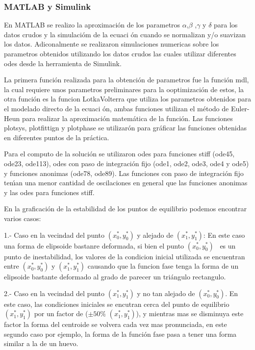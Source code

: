 \documentclass[letterpaper,11pt]{article}
\begin{document}
\bigskip

\subsubsection{MATLAB y Simulink}

En MATLAB se realizo la aproximaci\'{o}n de los parametros $\alpha $,$\beta $%
,$\gamma $ y $\delta $ para los datos crudos y la simulaci\'{o}m de la ecuaci%
\'{o}n cuando se normalizan y/o suavizan los datos. Adiconalmente se
realizaron simulaciones numericas sobre los parametros obtenidos utilizando
los datos crudos las cuales utilizar diferentes odes desde la herramienta de
Simulink.

La primera funci\'{o}n realizada para la obtenci\'{o}n de parametros fue la
funci\'{o}n mdl, la cual requiere unos parametros preliminares para la
ooptimizaci\'{o}n de estos, la otra funci\'{o}n es la funcion LotkaVolterra
que utiliza los parametros obtenidos para el modelado directo de la ecuaci%
\'{o}n, ambas funciones utilizan el m\'{e}todo de Euler-Heun para realizar
la aproximaci\'{o}n matem\'{a}tica de la funci\'{o}n. Las funciones plotsys,
plotfittign y plotphase se utilizar\'{o}n para gr\'{a}ficar las funciones
obtenidas en diferentes puntos de la pr\'{a}ctica.

Para el computo de la soluci\'{o}n se utilizaron odes para funciones stiff
(ode45, ode23, ode113), odes con paso de integraci\'{o}n fijo (ode1, ode2,
ode3, ode4 y ode5) y funciones anonimas (ode78, ode89). Las funciones con
paso de integraci\'{o}n fijo ten\'{\i}an una menor cantidad de oscilaciones
en general que las funciones anonimas y las odes para funciones stiff.

\bigskip

En la graficaci\'{o}n de la estabilidad de los puntos de equilibrio podemos
encontrar varios casos:

1.- Caso en la vecindad del punto $(x_{0}^{\ast },y_{0}^{\ast })$ y alejado
de $(x_{1}^{\ast },y_{1}^{\ast })$: En este caso una forma de elipsoide
bastanre deformada, si bien el punto $(x_{0}^{\ast },y_{0}^{\ast })$ \ es un
punto de inestabilidad, los valores de la condicion inicial utilizada se
encuentran entre $(x_{0}^{\ast },y_{0}^{\ast })$ y $(x_{1}^{\ast
},y_{1}^{\ast })$ causando que la funcion fase tenga la forma de un
elipsoide bastante deformado al grado de parecer un tri\'{a}ngulo rectangulo.

2.- Caso en la vecindad del punto $(x_{1}^{\ast },y_{1}^{\ast })$ y no tan
alejado de $(x_{0}^{\ast },y_{0}^{\ast })$. En este caso, las condiciones
iniciales se encutran cerca del punto de equilibrio $(x_{1}^{\ast
},y_{1}^{\ast })$ por un factor de ($\pm 50\%$ $(x_{1}^{\ast },y_{1}^{\ast })
$), y mientras mas se disminuya este factor la forma del centroide se
volvera cada vez mas pronunciada, en este segundo caso por ejemplo, la forma
de la funci\'{o}n fase pasa a tener una forma similar a la de un huevo.
\end{document}
